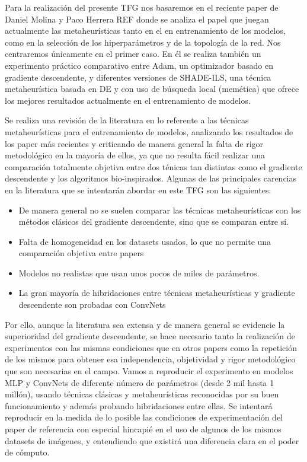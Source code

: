 Para la realización del presente TFG nos basaremos en el reciente paper de Daniel Molina y Paco Herrera REF donde se analiza el papel que juegan actualmente las metaheurísticas tanto en el en entrenamiento de los modelos, como en la selección de los hiperparámetros y de la topología de la red. Nos centraremos únicamente en el primer caso. En él se realiza también un experimento práctico comparativo entre Adam, un optimizador basado en gradiente descendente, y diferentes versiones de SHADE-ILS, una técnica metaheurística basada en DE y con uso de búsqueda local (memética) que ofrece los mejores resultados actualmente en el entrenamiento de modelos.

Se realiza una revisión de la literatura en lo referente a las técnicas metaheurísticas para el entrenamiento de modelos, analizando los resultados de los paper más recientes y criticando de manera general la falta de rigor metodológico en la mayoría de ellos, ya que no resulta fácil realizar una comparación totalmente objetiva entre dos ténicas tan distintas como el gradiente descendente y los algoritmos bio-inspirados. Algunas de las principales carencias en la literatura que se intentarán abordar en este TFG son las siguientes:

\begin{itemize}

\item De manera general no se suelen comparar las técnicas metaheurísticas con los métodos clásicos del gradiente descendente, sino que se comparan entre sí.

\item Falta de homogeneidad en los datasets usados, lo que no permite una comparación objetiva entre papers

\item Modelos no realistas que usan unos pocos de miles de parámetros.

\item La gran mayoría de hibridaciones entre técnicas metaheurísticas y gradiente descendente son probadas con ConvNets

\end{itemize}

Por ello, aunque la literatura sea extensa y de manera general se evidencie la superioridad del gradiente descendente, se hace necesario tanto la realización de experimentos con las mismas condiciones que en otros papers como la repetición de los mismos para obtener esa independencia, objetividad y rigor metodológico que son necesarias en el campo. Vamos a reproducir el experimento en modelos MLP y ConvNets de diferente número de parámetros (desde 2 mil hasta 1 millón), usando técnicas clásicas y metaheurísticas reconocidas por su buen funcionamiento y además probando hibridaciones entre ellas. Se intentará reproducir en la medida de lo posible las condiciones de experimentación del paper de referencia con especial hincapié en el uso de algunos de los mismos datasets de imágenes, y entendiendo que existirá una diferencia clara en el poder de cómputo.



